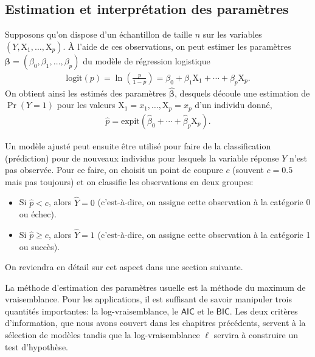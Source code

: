 \documentclass[
  11pt,
  letterpaper,
]{scrbook}
\providecommand{\tightlist}{%
  \setlength{\itemsep}{0pt}\setlength{\parskip}{0pt}}\usepackage{longtable,booktabs,array}
\theoremstyle{definition}
\theoremstyle{remark}
\begin{document}
\subsection{Estimation et interprétation des
paramètres}\label{estimation-et-interpruxe9tation-des-paramuxe8tres}

Supposons qu'on dispose d'un échantillon de taille \(n\) sur les
variables \((Y, \mathrm{X}_1, \ldots, \mathrm{X}_p)\). À l'aide de ces
observations, on peut estimer les paramètres
\(\boldsymbol{\beta} = (\beta_0, \beta_1 ,\ldots, \beta_p)\) du modèle
de régression logistique \begin{align*}
\textrm{logit}(p) = \ln \left( \frac{p}{1-p}\right) = \beta_0 + \beta_1 \mathrm{X}_1 + \cdots + \beta_p\mathrm{X}_p.
\end{align*} On obtient ainsi les estimés des paramètres
\(\widehat{\boldsymbol{\beta}}\), desquels découle une estimation de
\(\Pr(Y=1)\) pour les valeurs
\(\mathrm{X}_1=x_1, \ldots, \mathrm{X}_p=x_p\) d'un individu donné,
\begin{align*}
 \widehat{p} = \textrm{expit}(\widehat{\beta}_0 + \cdots + \widehat{\beta}_p\mathrm{X}_p).
\end{align*}

Un modèle ajusté peut ensuite être utilisé pour faire de la
classification (prédiction) pour de nouveaux individus pour lesquels la
variable réponse \(Y\) n'est pas observée. Pour ce faire, on choisit un
point de coupure \(c\) (souvent \(c=0.5\) mais pas toujours) et on
classifie les observations en deux groupes:

\begin{itemize}
\tightlist
\item
  Si \(\widehat{p}< c\), alors \(\widehat{Y}=0\) (c'est-à-dire, on
  assigne cette observation à la catégorie 0 ou échec).
\item
  Si \(\widehat{p} \geq c\), alors \(\widehat{Y}=1\) (c'est-à-dire, on
  assigne cette observation à la catégorie 1 ou succès).
\end{itemize}

On reviendra en détail sur cet aspect dans une section suivante.

La méthode d'estimation des paramètres usuelle est la méthode du maximum
de vraisemblance. Pour les applications, il est suffisant de savoir
manipuler trois quantités importantes: la log-vraisemblance, le
\(\mathsf{AIC}\) et le \(\mathsf{BIC}\). Les deux critères
d'information, que nous avons couvert dans les chapitres précédents,
servent à la sélection de modèles tandis que la log-vraisemblance
\(\ell\) servira à construire un test d'hypothèse.
\end{document}
